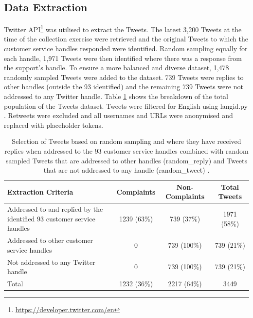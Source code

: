 \subsection{Data Extraction}
Twitter API\footnote{\url{https://developer.twitter.com/en}} was utilised to extract the Tweets. The latest 3,200 Tweets at the time of the collection exercise were retrieved and the original Tweets to which the customer service handles responded were identified. Random sampling equally for each handle, 1,971 Tweets were then identified where there was a response from the support's handle. To ensure a more balanced and diverse dataset, 1,478 randomly sampled Tweets were added to the dataset. 739 Tweets were replies to other handles (outside the 93 identified) and the remaining 739 Tweets were not addressed to any Twitter handle. Table \ref{tab: tweet_counts} shows the breakdown of the total population of the Tweets dataset. Tweets were filtered for English using langid.py \cite{luiLangidPyOfftheshelf2012}. Retweets were excluded and all usernames and URLs were anonymised and replaced with placeholder tokens.
\begin{table}[ht]
    \captionsetup{font=small}
    \small
    \centering
    \begin{tabularx}{\textwidth}{|X|c|c|c|}
        \hline
        \rowcolor[gray]{0.7}
        \textbf{Extraction Criteria}                                           & \textbf{Complaints} & \textbf{Non-Complaints} & \textbf{Total Tweets} \\
        \hline
        Addressed to and replied by the identified 93 customer service handles & 1239 \small{(63\%)} & 739 \small{(37\%)}      & 1971 \small{(58\%)}   \\
        \rowcolor[gray]{0.9}
        Addressed to other customer service handles                            & 0                   & 739 \small{(100\%)}     & 739 \small{(21\%)}    \\
        Not addressed to any Twitter handle                                    & 0                   & 739 \small{(100\%)}     & 739 \small{(21\%)}    \\
        \hline
        \rowcolor[gray]{0.9}
        Total                                                                  & 1232 \small{(36\%)} & 2217 \small{(64\%)}     & 3449                  \\
        \hline
    \end{tabularx}
    \caption{Selection of Tweets based on random sampling and where they have received replies when addressed to the 93 customer service handles combined with random sampled Tweets that are addressed to other handles (random\_reply) and Tweets that are not addressed to any handle (random\_tweet) \cite{preotiuc-pietro_automatically_2019}.}
    \label{tab: tweet_counts}
\end{table}

